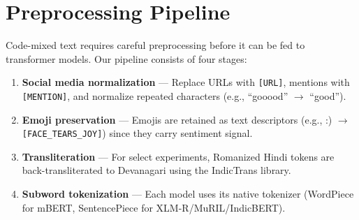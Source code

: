 \section{Preprocessing Pipeline}

Code-mixed text requires careful preprocessing before it can be fed to transformer models. Our pipeline consists of four stages:

\begin{enumerate}[nosep,itemsep=3pt]
  \item \textbf{Social media normalization} — Replace URLs with \texttt{[URL]}, mentions with \texttt{[MENTION]}, and normalize repeated characters (e.g., ``gooood'' $\rightarrow$ ``good'').
  \item \textbf{Emoji preservation} — Emojis are retained as text descriptors (e.g., :) $\rightarrow$ \texttt{[FACE\_TEARS\_JOY]}) since they carry sentiment signal.
  \item \textbf{Transliteration} — For select experiments, Romanized Hindi tokens are back-transliterated to Devanagari using the IndicTrans library.
  \item \textbf{Subword tokenization} — Each model uses its native tokenizer (WordPiece for mBERT, SentencePiece for XLM-R/MuRIL/IndicBERT).
\end{enumerate}
